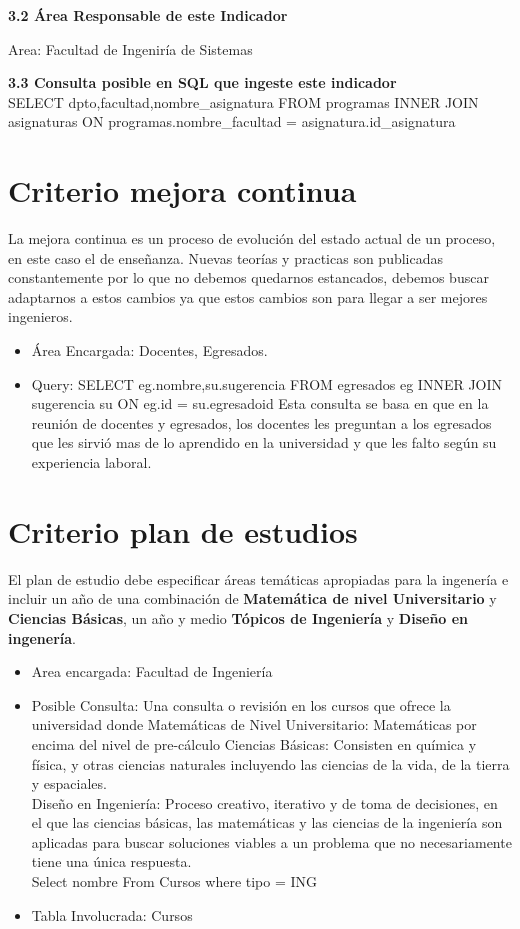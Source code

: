 \documentclass[12pt,a4paper]{report}
\begin{document}
\textbf{3.2 Área Responsable de este Indicador}

 Area: Facultad de Ingeniría de Sistemas

\textbf{3.3 Consulta posible en SQL que ingeste este indicador}\\

SELECT dpto,facultad,nombre\_asignatura FROM programas INNER JOIN asignaturas ON programas.nombre\_facultad = asignatura.id\_asignatura


\section{ Criterio mejora continua}
La mejora continua es un proceso de evolución del estado actual de un proceso, en este caso el de enseñanza. Nuevas teorías y practicas son publicadas constantemente por lo que no debemos quedarnos estancados, debemos buscar adaptarnos a estos cambios ya que estos cambios son para llegar a ser mejores ingenieros.
\begin{itemize}
\item Área Encargada: Docentes, Egresados.
\item Query: SELECT eg.nombre,su.sugerencia FROM egresados eg INNER JOIN sugerencia su ON eg.id = su.egresadoid
Esta consulta se basa en que en la reunión de docentes y egresados, los docentes les preguntan a los egresados que les sirvió mas de lo aprendido en la universidad y que les falto según su experiencia laboral.
\end{itemize}
\section{ Criterio plan de estudios}
El plan de estudio debe especificar áreas temáticas apropiadas para la ingenería e incluir un año de una combinación de \textbf{Matemática de nivel Universitario} y \textbf{Ciencias Básicas}, un año y medio \textbf{Tópicos de Ingeniería} y \textbf{Diseño en ingenería}.

\begin{itemize}
\item Area encargada: Facultad de Ingeniería

\item Posible Consulta: Una consulta o revisión en los cursos que ofrece la universidad donde Matemáticas de Nivel Universitario: Matemáticas por encima del nivel de pre-cálculo
Ciencias Básicas: Consisten en química y física, y otras ciencias naturales incluyendo las ciencias de la vida, de la tierra y espaciales.\\
Diseño en Ingeniería: Proceso creativo, iterativo y de toma de decisiones, en el que las ciencias básicas, las matemáticas y las ciencias de la ingeniería son aplicadas para buscar soluciones viables a un problema que no necesariamente tiene una única respuesta.\\
Select nombre From Cursos where tipo = ING

\item Tabla Involucrada: Cursos
\end{itemize}
\end{document}
